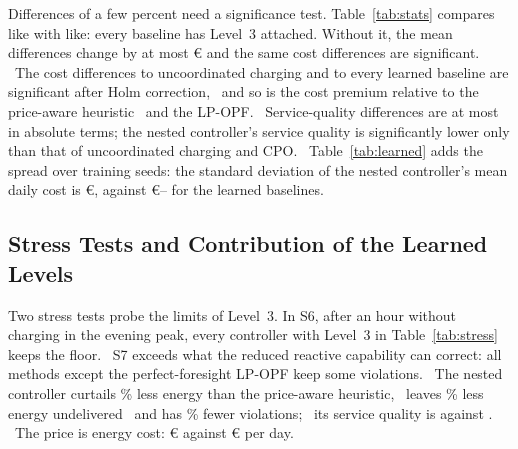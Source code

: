 Differences of a few percent need a significance test. Table~\ref{tab:stats}
compares like with like: every baseline has Level~3
attached. Without it, the mean differences change by at most
\euro\GStatsLThreeDiffMax{} and the same cost differences are
significant.%
\ The cost differences to uncoordinated charging and to every learned baseline
are significant after Holm correction,%
\ and so is the cost premium relative to the price-aware heuristic%
\ and the LP-OPF.%
\ Service-quality differences are at most \GSqDiffAbsmaxSThree{} in absolute
terms; the nested controller's service quality is significantly lower only
than that of uncoordinated charging and CPO.%
\ Table~\ref{tab:learned} adds the spread over training seeds: the standard
deviation of the nested controller's mean daily cost is
\euro\GSeedStdNestedSThree, against
\euro\GSeedStdLearnedMinSThree--\GSeedStdLearnedMaxSThree{} for the learned
baselines.%

\begin{table}[t]
\centering
\caption{Learned Methods at S3: Mean Daily Cost, Its Standard Deviation Over \GTrainSeedsWordCap{} Training Seeds, Service Quality and Training Time per Seed (One CPU Core)}
\label{tab:learned}
\footnotesize
\setlength{\tabcolsep}{3pt}

\end{table}


\begin{table}[t]
\centering
\caption{Level-3 Stress Tests (S6: No Charging 19:00--20:00; S7: 360 Vehicles, $S_i=\GSRatedSSeven$\,kVA). Viol.\ in \%; $V^{\min}$: Mean Daily Minimum Voltage (p.u.); Curt.\ and Unmet in kWh per Day}
\label{tab:stress}
\footnotesize
\setlength{\tabcolsep}{4pt}

\end{table}

\subsection{Stress Tests and Contribution of the Learned Levels}
\label{sec:res-stress}
Two stress tests probe the limits of Level~3. In S6, after an hour without
charging in the evening peak, every controller
with Level~3 in Table~\ref{tab:stress} keeps the floor.%
\ S7 exceeds what the reduced reactive capability can correct: all methods
except the perfect-foresight LP-OPF keep some violations.%
\ The nested controller curtails
\GReductionCurtNestedPaSSeven\% less energy than the price-aware heuristic,%
\ leaves \GReductionUnmetNestedPaSSeven\% less energy undelivered%
\ and has \GReductionViolNestedPaSSeven\% fewer violations;%
\ its service quality is \GNestedSSevenSq{} against
\GPriceAwareLThreeSSevenSq.%
\ The price is energy cost: \euro\GNestedSSevenCost{} against
\euro\GPriceAwareLThreeSSevenCost{} per day.%


